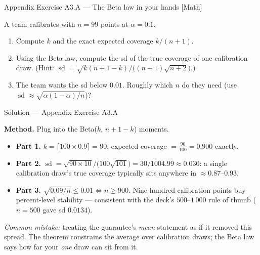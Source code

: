 \documentclass[aspectratio=169,11pt]{beamer}
\begin{document}
\begin{frame}{Appendix Exercise A3.A --- The Beta law in your hands [Math]}
\begin{exercise}
  A team calibrates with $n = 99$ points at $\alpha = 0.1$.
  \begin{enumerate}
    \item Compute $k$ and the exact expected coverage $k/(n+1)$.
    \item Using the Beta law, compute the sd of the true coverage of one calibration
          draw. (Hint: $\operatorname{sd} = \sqrt{k(n+1-k)}\big/\big((n+1)\sqrt{n+2}\big)$.)
    \item The team wants the sd below $0.01$. Roughly which $n$ do they need
          (use $\operatorname{sd} \approx \sqrt{\alpha(1-\alpha)/n}$)?
  \end{enumerate}
\end{exercise}
\end{frame}

\begin{frame}{Solution --- Appendix Exercise A3.A}
\begin{solutionbox}
  \textbf{Method.} Plug into the Beta($k$, $n+1-k$) moments.
  \begin{itemize}
    \item \textbf{Part 1.} $k = \lceil 100 \times 0.9 \rceil = 90$; expected coverage
          $= \tfrac{90}{100} = 0.900$ exactly.
    \item \textbf{Part 2.} $\operatorname{sd} =
          \sqrt{90 \times 10} \big/ \big(100 \sqrt{101}\big)
          = 30 / 1004.99 \approx 0.030$: a single calibration draw's true coverage
          typically sits anywhere in $\approx 0.87$--$0.93$.
    \item \textbf{Part 3.} $\sqrt{0.09 / n} \le 0.01 \iff n \ge 900$. Nine
          hundred calibration points buy percent-level stability --- consistent with
          the deck's $500$--$1\,000$ rule of thumb ($n = 500$ gave sd $0.0134$).
  \end{itemize}
  \textit{Common mistake:} treating the guarantee's \emph{mean} statement as if it
  removed this spread. The theorem constrains the average over calibration draws;
  the Beta law says how far your \emph{one} draw can sit from it.
\end{solutionbox}
\end{frame}
\end{document}
